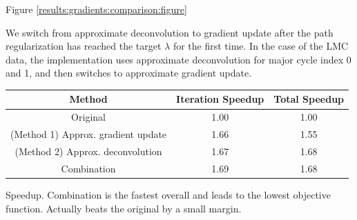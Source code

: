 Figure \ref{results:gradients:comparison:figure}

We switch from approximate deconvolution to gradient update after the path regularization has reached the target $\lambda$ for the first time. In the case of the LMC data, the implementation uses approximate deconvolution for major cycle index 0 and 1, and then switches to approximate gradient update.


\begin{center}
	\begin{tabular}{ c||c|c } 
		\hline
		Method & Iteration Speedup & Total Speedup \\ \hline \hline
		Original & 1.00 & 1.00 \\ 
		(Method 1) Approx. gradient update & 1.66 & 1.55 \\ 
		(Method 2) Approx. deconvolution & 1.67 & 1.68 \\ \hline
		Combination & 1.69 & 1.68 \\ 
		\hline
	\end{tabular}
	\label{results:gradients:comparison:speedup}
\end{center}
Speedup. Combination is the fastest overall and leads to the lowest objective function. Actually beats the original by a small margin.


